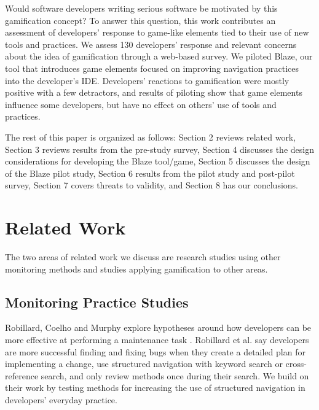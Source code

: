 \documentclass{sig-alternate}
\begin{document}
Would software developers writing serious software be motivated by this gamification concept? To answer this question, this work contributes an assessment of developers' response to game-like elements tied to their use of new tools and practices.  We assess 130 developers' response and relevant concerns about the idea of gamification through a web-based survey.  We piloted Blaze, our tool that introduces game elements focused on improving navigation practices into the developer's IDE.  Developers' reactions to gamification were mostly positive with a few detractors, and results of piloting show that game elements influence some developers, but have no effect on others' use of tools and practices.

The rest of this paper is organized as follows:  Section 2 reviews related work, Section 3 reviews results from the pre-study survey, Section 4 discusses the design considerations for developing the Blaze tool/game, Section 5 discusses the design of the Blaze pilot study,  Section 6 results from the pilot study and post-pilot survey, Section 7 covers threats to validity, and Section 8 has our conclusions.

\section{Related Work}

The two areas of related work we discuss are research studies using other monitoring methods and studies applying gamification to other areas.

\subsection{Monitoring Practice Studies }

Robillard, Coelho and Murphy explore hypotheses around how developers can be more effective at performing a maintenance task \cite{wbsnipes:Robillard2004How}.  Robillard et al. say developers are more successful finding and fixing bugs when they create a detailed plan for implementing a change, use structured navigation with keyword search or cross-reference search, and only review methods once during their search.  We build on their work by testing methods for increasing the use of structured navigation in developers' everyday practice.
\end{document}
